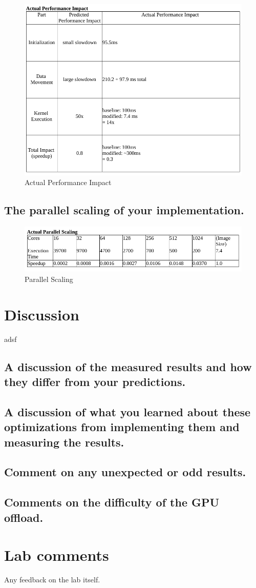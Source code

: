 \documentclass{article}
\begin{document}
\begin{figure}[h!t]
    \centering
    \includegraphics[width=1\textwidth]{actual.png}
    \caption{Actual Performance Impact}
    \label{fig:actual}
\end{figure}

\subsection{The parallel scaling of your implementation.}

\begin{figure}[h!t]
    \centering
    \includegraphics[width=1\textwidth]{parallel.png}
    \caption{Parallel Scaling}
    \label{fig:parallel}
\end{figure}

\section{Discussion}
adsf
\subsection{A discussion of the measured results and how they differ from your predictions.}

\subsection{A discussion of what you learned about these optimizations from implementing them and measuring the results.}

\subsection{Comment on any unexpected or odd results.}

\subsection{Comments on the difficulty of the GPU offload.}

\section{Lab comments}
Any feedback on the lab itself.
\end{document}
